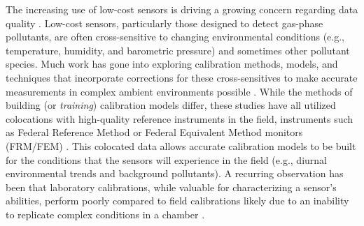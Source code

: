 \documentclass[journal abbreviation, manuscript]{copernicus}
\begin{document}

The increasing use of low-cost sensors is driving a growing concern regarding data quality \citep{Clements2017}. Low-cost sensors, particularly those designed to detect gas-phase pollutants, are often cross-sensitive to changing environmental conditions (e.g., temperature, humidity, and barometric pressure) and sometimes other pollutant species.  Much work has gone into exploring calibration methods, models, and techniques that incorporate corrections for these cross-sensitives to make accurate measurements in complex ambient environments possible \citep{Spinelle2014, Spinelle2015, SPINELLE2017706, Cross2017, Sadighi2018, Zimmerman2018}. While the methods of building (or \textit{training}) calibration models differ, these studies have all utilized colocations with high-quality reference instruments in the field, instruments such as Federal Reference Method or Federal Equivalent Method monitors (FRM/FEM) \citep{Spinelle2014, Spinelle2015, SPINELLE2017706, Cross2017, Sadighi2018, Zimmerman2018}. This colocated data allows accurate calibration models to be built for the conditions that the sensors will experience in the field (e.g., diurnal environmental trends and background pollutants). A recurring observation has been that laboratory calibrations, while valuable for characterizing a sensor’s abilities, perform poorly compared to field calibrations likely due to an inability to replicate complex conditions in a chamber \citep{Piedrahita2014, Castell2017}.  
\end{document}
